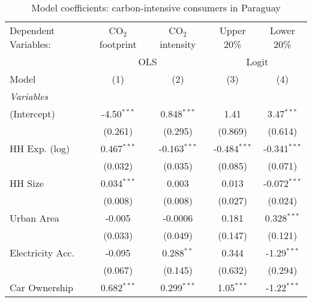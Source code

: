 
\begin{table}[htbp!]
   \centering
   \small
   \begin{adjustbox}{width = 1\textwidth, max height = 0.95\textheight, center}
      \begin{threeparttable}[b]
         \caption{\label{tab:Logit_1_PRY} Model coefficients: carbon-intensive consumers in Paraguay}
         \begin{tabular}{lcccc}
            \tabularnewline \midrule \midrule
            Dependent Variables: & CO$_{2}$ footprint & CO$_{2}$ intensity & Upper 20\%     & Lower 20\%\\   
             & \multicolumn{2}{c}{OLS} & \multicolumn{2}{c}{Logit} \\ 
            Model                & (1)                & (2)                & (3)            & (4)\\  
            \midrule
            \emph{Variables}\\
            (Intercept)          & -4.50$^{***}$      & 0.848$^{***}$      & 1.41           & 3.47$^{***}$\\   
                                 & (0.261)            & (0.295)            & (0.869)        & (0.614)\\   
            HH Exp. (log)        & 0.467$^{***}$      & -0.163$^{***}$     & -0.484$^{***}$ & -0.341$^{***}$\\   
                                 & (0.032)            & (0.035)            & (0.085)        & (0.071)\\   
            HH Size              & 0.034$^{***}$      & 0.003              & 0.013          & -0.072$^{***}$\\   
                                 & (0.008)            & (0.008)            & (0.027)        & (0.024)\\   
            Urban Area           & -0.005             & -0.0006            & 0.181          & 0.328$^{***}$\\   
                                 & (0.033)            & (0.049)            & (0.147)        & (0.121)\\   
            Electricity Acc.     & -0.095             & 0.288$^{**}$       & 0.344          & -1.29$^{***}$\\   
                                 & (0.067)            & (0.145)            & (0.632)        & (0.294)\\   
            Car Ownership        & 0.682$^{***}$      & 0.299$^{***}$      & 1.05$^{***}$   & -1.22$^{***}$\\   

\end{tabular}
\end{threeparttable}
\end{adjustbox}
\end{table}
